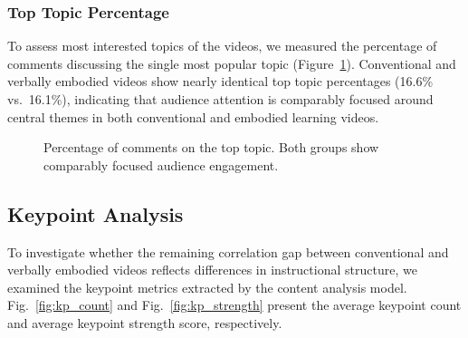 \subsubsection{Top Topic Percentage}
To assess most interested topics of the videos, we measured the percentage of comments discussing the single most popular topic (Figure~\ref{fig:yt_top}). Conventional and verbally embodied videos show nearly identical top topic percentages (16.6\% vs.\ 16.1\%), indicating that audience attention is comparably focused around central themes in both conventional and embodied learning videos.

\begin{figure}[h!]
    \centering
    \caption{Percentage of comments on the top topic. Both groups show comparably focused audience engagement.}
    \label{fig:yt_top}
\end{figure}


\subsection{Keypoint Analysis}

To investigate whether the remaining correlation gap between conventional and verbally embodied videos reflects differences in instructional structure, we examined the keypoint metrics extracted by the content analysis model. Fig.~\ref{fig:kp_count} and Fig.~\ref{fig:kp_strength} present the average keypoint count and average keypoint strength score, respectively.

